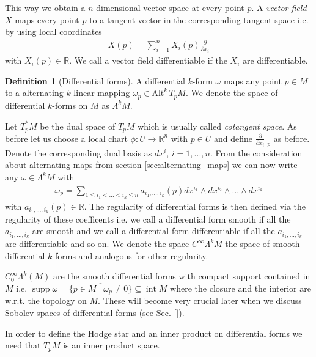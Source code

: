\documentclass[12pt,a4paper]{article}
\numberwithin{equation}{subsection}
\numberwithin{lemma}{subsection}
\theoremstyle{definition}
\newtheorem{definition}[lemma]{Definition}
\DeclareMathOperator{\interior}{int}
\DeclareMathOperator{\supp}{supp}
\newcommand{\alternating}[2]{ {\text{Alt}^{#1}\,#2} }
\newcommand{\smoothcompforms}[2]{C_0^\infty \Lambda^{#1}(#2)}
\newcommand{\real}{\mathbb{R}}
\begin{document}
This way we obtain a $n$-dimensional vector space at every point $p$. A 
\textit{vector field} $X$ maps every point $p$ to a tangent vector 
in the corresponding tangent space i.e. by using local coordinates
\begin{align*}
    X(p) = \sum_{i=1}^n X_i(p) \frac{\partial}{\partial x_i}
\end{align*}
with $X_i(p) \in \real$. We call a vector field differentiable if 
the $X_i$ are differentiable.

\begin{definition}[Differential forms]
    A differential $k$-form $\omega$ maps any point $p \in M$ to a 
    alternating $k$-linear mapping $\omega_p \in \alternating{k}{T_p M}$.
    We denote the space of differential $k$-forms on $M$ as $\Lambda^k M$.
\end{definition}

Let $T_p^* M$ be the dual space of $T_p M$ which is usually called 
\textit{cotangent space}.
As before let us choose a local chart $\phi: U \rightarrow \real^n$ with 
$p \in U$ and define $\frac{\partial}{\partial x_i}|_p$ as before. 
Denote the corresponding
dual basis as $dx^i$, $i = 1,...,n$. From the consideration about
alternating maps from section \ref{sec:alternating_maps} we can now write any 
$\omega \in \Lambda^k M$ with 
\begin{align*}
    \omega_p = \sum\limits_{1\leq i_1 < ... < i_k \leq n} 
        a_{i_1,...,i_k}(p) dx^{i_1} \wedge dx^{i_2} \wedge ... \wedge dx^{i_k}
\end{align*}
with $a_{i_1,...,i_k}(p) \in \real$. The regularity of differential forms 
is then defined via the regularity of these coefficents i.e. we call 
a differential form smooth if all the $a_{i_1,...,i_k}$ are smooth 
and we call a differential form differentiable if all the $a_{i_1,...,i_k}$
are differentiable and so on. We denote the space $C^\infty \Lambda^k M$ the 
space of smooth differential $k$-forms and analogous for other regularity.

$\smoothcompforms{k}{M}$ are the smooth differential forms
with compact support contained in $M$ i.e. 
$\supp \omega = \overline{\{ p \in M \mid \omega_p \neq 0  \}} 
\subseteq \interior M$ where the closure and the interior are w.r.t. 
the topology on $M$.
These will become very crucial later when we discuss Sobolev spaces 
of differential forms (see Sec. \ref{}). 

In order to define the Hodge star and an inner product on differential forms
we need that 
$T_p M$ is an inner product space.
\end{document}
